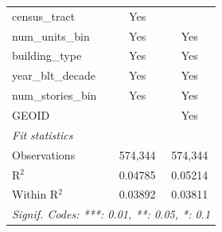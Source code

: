 \begin{tabular}{lcc}
   census\_tract                                                       & Yes            & \\  
   num\_units\_bin                                                     & Yes            & Yes\\  
   building\_type                                                      & Yes            & Yes\\  
   year\_blt\_decade                                                   & Yes            & Yes\\  
   num\_stories\_bin                                                   & Yes            & Yes\\  
   GEOID                                                               &                & Yes\\  
   \midrule
   \emph{Fit statistics}\\
   Observations                                                        & 574,344        & 574,344\\  
   R$^2$                                                               & 0.04785        & 0.05214\\  
   Within R$^2$                                                        & 0.03892        & 0.03811\\  
   \midrule \midrule
   \multicolumn{3}{l}{\emph{Signif. Codes: ***: 0.01, **: 0.05, *: 0.1}}\\
\end{tabular}
\par\endgroup
\begingroup
\centering
